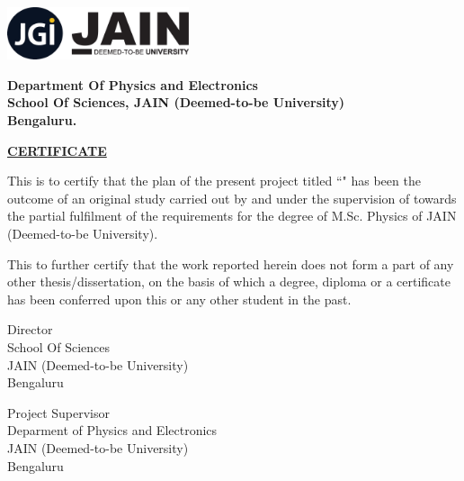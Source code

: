 
\thispagestyle{empty}

\begin{center}

\includegraphics[width=0.4\textwidth, height=0.12\textwidth, ]{images/jain logo.png}

\large
\vspace{1cm}

\textbf{Department Of Physics and Electronics\\
School Of Sciences, JAIN (Deemed-to-be University)\\
Bengaluru.}

\vspace{1cm}

\underline{\textbf{CERTIFICATE}}

\end{center}

\vspace{0.5cm}

\normalfont{}
\noindent
This is to certify that the plan of the present project titled ``\textbf{\projectname}" has been the outcome of an original study carried out by \textbf{\authone} and \textbf{\authtwo} under the supervision of \textbf{\guidename} towards the partial fulfilment of the requirements for the degree of M.Sc. Physics of JAIN (Deemed-to-be University).

\vspace{0.5cm}

\noindent
This to further certify that the work reported herein does not form a part of any other thesis/dissertation, on the basis of which a degree, diploma or a certificate has been conferred upon this or any other student in the past.

\vspace{3cm}

\noindent
\begin{minipage}{0.5\textwidth}

\textbf{\director}

Director\\
School Of Sciences\\
JAIN (Deemed-to-be University)\\
Bengaluru

\end{minipage}%
\begin{minipage}{0.5\textwidth}
\textbf{\guidename}

Project Supervisor\\
Deparment of Physics and Electronics\\
JAIN (Deemed-to-be University)\\
Bengaluru
\end{minipage}
